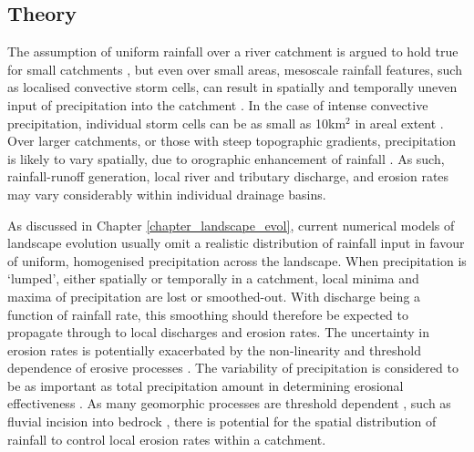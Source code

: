 %

\subsection{Theory}
The assumption of uniform rainfall over a river catchment is argued to hold true for small catchments \citep{Solyom2004,Tucker2010}, but even over small areas, mesoscale rainfall features, such as localised convective storm cells, can result in spatially and temporally uneven input of precipitation into the catchment \citep{Peleg2014}. In the case of intense convective precipitation, individual storm cells can be as small as 10km$^2$ in areal extent  \citep{weisman1986characteristics,vonhardenberg2003shape}. Over larger catchments, or those with steep topographic gradients, precipitation is likely to vary spatially, due to orographic enhancement of rainfall \citep{Roe2003,han2015measuring}. As such, rainfall-runoff generation, local river and tributary discharge, and erosion rates may vary considerably within individual drainage basins. 

As discussed in Chapter \ref{chapter_landscape_evol}, current numerical models of landscape evolution usually omit a realistic distribution of rainfall input in favour of uniform, homogenised precipitation across the landscape. When precipitation is `lumped', either spatially or temporally in a catchment, local minima and maxima of precipitation are lost or smoothed-out. With discharge being a function of rainfall rate, this smoothing should therefore be expected to propagate through to local discharges and erosion rates. The uncertainty in erosion rates is potentially exacerbated by the non-linearity and threshold dependence of erosive processes \citep{coulthard1998non,phillips2003sources}. The variability of precipitation is considered to be as important as total precipitation amount in determining erosional effectiveness \citep{Tucker2000,Tucker2010}. As many geomorphic processes are threshold dependent \citep{schumm1979geomorphic}, such as fluvial incision into bedrock \citep{sklar2001sediment,snyder2003importance}, there is potential for the spatial distribution of rainfall to control local erosion rates within a catchment. 


